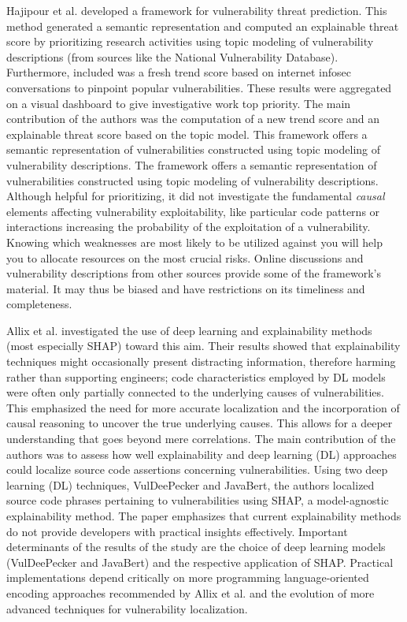 \documentclass{buthesis}
\begin{document}
Hajipour et al. \cite{Hajipour2023} developed a framework for vulnerability threat prediction. This method generated a semantic representation and computed an explainable threat score by prioritizing research activities using topic modeling of vulnerability descriptions (from sources like the National Vulnerability Database). Furthermore, included was a fresh trend score based on internet infosec conversations to pinpoint popular vulnerabilities. These results were aggregated on a visual dashboard to give investigative work top priority. The main contribution of the authors was the computation of a new trend score and an explainable threat score based on the topic model. This framework offers a semantic representation of vulnerabilities constructed using topic modeling of vulnerability descriptions. The framework offers a semantic representation of vulnerabilities constructed using topic modeling of vulnerability descriptions. Although helpful for prioritizing, it did not investigate the fundamental \emph{causal} elements affecting vulnerability exploitability, like particular code patterns or interactions increasing the probability of the exploitation of a vulnerability. Knowing which weaknesses are most likely to be utilized against you will help you to allocate resources on the most crucial risks. Online discussions and vulnerability descriptions from other sources provide some of the framework's material. It may thus be biased and have restrictions on its timeliness and completeness.

Allix et al. \cite{Allix2024} investigated the use of deep learning and explainability methods (most especially SHAP) toward this aim. Their results showed that explainability techniques might occasionally present distracting information, therefore harming rather than supporting engineers; code characteristics employed by DL models were often only partially connected to the underlying causes of vulnerabilities. This emphasized the need for more accurate localization and the incorporation of causal reasoning to uncover the true underlying causes. This allows for a deeper understanding that goes beyond mere correlations. The main contribution of the authors was to assess how well explainability and deep learning (DL) approaches could localize source code assertions concerning vulnerabilities. Using two deep learning (DL) techniques, VulDeePecker and JavaBert, the authors localized source code phrases pertaining to vulnerabilities using SHAP, a model-agnostic explainability method. The paper emphasizes that current explainability methods do not provide developers with practical insights effectively. Important determinants of the results of the study are the choice of deep learning models (VulDeePecker and JavaBert) and the respective application of SHAP. Practical implementations depend critically on more programming language-oriented encoding approaches recommended by Allix et al. \cite{Allix2024} and the evolution of more advanced techniques for vulnerability localization.
\end{document}
